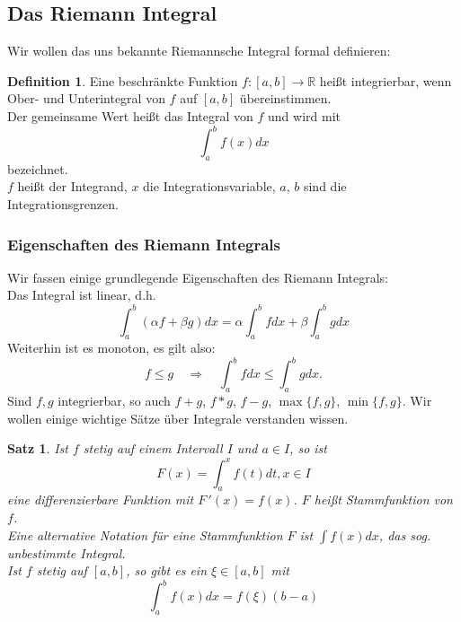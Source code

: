 \documentclass[fontsize=12pt,paper=a4,twoside,bibtotoc,idxtotoc,
liststotoc,pagesize,BCOR1.2cm,DIV15,chapterprefix,pagesize=pdftex]{scrbook}
\theoremstyle{plain}
\newtheorem{sz}[equation]{Satz}
\theoremstyle{definition}
\newtheorem{df}[equation]{Definition}
\theoremstyle{remark}
\begin{document}
\subsection{Das Riemann Integral}
Wir wollen das uns bekannte Riemannsche Integral formal definieren:
\begin{df}
Eine beschränkte Funktion $f:[a,b] \rightarrow \mathbb{R}$ heißt 
integrierbar, wenn Ober- und Unterintegral von $f$ auf $[a,b]$ übereinstimmen.\\
Der gemeinsame Wert heißt das Integral von $f$ und wird mit 
\[ \int_a^b f(x)dx \]
bezeichnet.\\ 
$f$ heißt der Integrand, $x$ die Integrationsvariable, $a$, $b$ sind die Integrationsgrenzen.
\end{df}
\subsubsection{Eigenschaften des Riemann Integrals}
Wir fassen einige grundlegende Eigenschaften des Riemann Integrals:\\
Das Integral ist linear, d.h.
\[ \int_a^b (\alpha f + \beta g) dx = \alpha \int_a^b fdx + \beta
\int_a^b g dx \]
Weiterhin ist es monoton, es gilt also:
\[  f \leq g \quad \Rightarrow \quad \int_a^b f dx \leq \int_a^b g
dx.\]
Sind $f,g$ integrierbar, so auch $f+g$, $f*g$, $f-g$,
$\max\{f,g\}$, $\min \{f,g \}$. 
Wir wollen einige wichtige Sätze über Integrale verstanden wissen.
\begin{sz}
Ist $f$ stetig auf einem Intervall $I$ und $a \in I$, so ist 
\[F(x)= \int_a^x f(t) dt, x \in I \] eine differenzierbare Funktion mit
$F\,'(x)=f(x)$. $F$ heißt Stammfunktion von $f$.\\
Eine alternative Notation für eine Stammfunktion $F$ ist  $\int f(x) dx$, das sog. unbestimmte Integral.\\
Ist $f$ stetig auf $[a,b]$, so gibt es ein $\xi \in [a,b]$ mit
\[\int_a^b f(x)dx = f(\xi) (b-a)\]
\end{sz}
\end{document}
